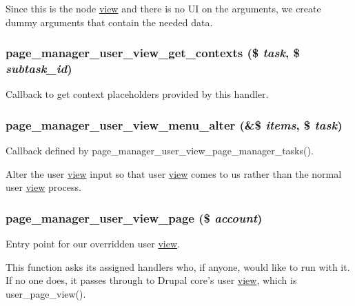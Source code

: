 Since this is the node \hyperlink{classview}{view} and there is no UI on the arguments, we create dummy arguments that contain the needed data. \hypertarget{user__view_8inc_a89888e8d3a6902a2140f9b8f1f7ba63d}{
\subsubsection[{page\_\-manager\_\-user\_\-view\_\-get\_\-contexts}]{\setlength{\rightskip}{0pt plus 5cm}page\_\-manager\_\-user\_\-view\_\-get\_\-contexts (\$ {\em task}, \/  \$ {\em subtask\_\-id})}}
\label{user__view_8inc_a89888e8d3a6902a2140f9b8f1f7ba63d}
Callback to get context placeholders provided by this handler. \hypertarget{user__view_8inc_aea07e4948f35a4526683a303d3d86fe8}{
\subsubsection[{page\_\-manager\_\-user\_\-view\_\-menu\_\-alter}]{\setlength{\rightskip}{0pt plus 5cm}page\_\-manager\_\-user\_\-view\_\-menu\_\-alter (\&\$ {\em items}, \/  \$ {\em task})}}
\label{user__view_8inc_aea07e4948f35a4526683a303d3d86fe8}
Callback defined by page\_\-manager\_\-user\_\-view\_\-page\_\-manager\_\-tasks().

Alter the user \hyperlink{classview}{view} input so that user \hyperlink{classview}{view} comes to us rather than the normal user \hyperlink{classview}{view} process. \hypertarget{user__view_8inc_a5f43335f12371da4076984ce321f749d}{
\subsubsection[{page\_\-manager\_\-user\_\-view\_\-page}]{\setlength{\rightskip}{0pt plus 5cm}page\_\-manager\_\-user\_\-view\_\-page (\$ {\em account})}}
\label{user__view_8inc_a5f43335f12371da4076984ce321f749d}
Entry point for our overridden user \hyperlink{classview}{view}.

This function asks its assigned handlers who, if anyone, would like to run with it. If no one does, it passes through to Drupal core's user \hyperlink{classview}{view}, which is user\_\-page\_\-view(). 